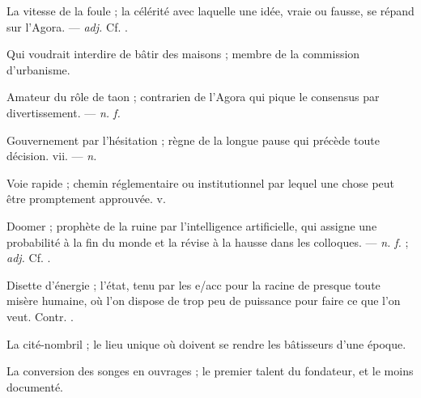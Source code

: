  La vitesse de la foule ; la célérité avec laquelle une idée, vraie ou fausse, se répand sur l'Agora. ---  \textit{adj.} Cf. .

  Qui voudrait interdire de bâtir des maisons ; membre de la commission d'urbanisme.

 Amateur du rôle de taon ; contrarien de l'Agora qui pique le consensus par divertissement. ---  \textit{n. f.}

 Gouvernement par l'hésitation ; règne de la longue pause qui précède toute décision.   vii. ---  \textit{n.}

 Voie rapide ; chemin réglementaire ou institutionnel par lequel une chose peut être promptement approuvée.   v.

 Doomer ; prophète de la ruine par l'intelligence artificielle, qui assigne une probabilité à la fin du monde et la révise à la hausse dans les colloques. ---  \textit{n. f.} ;  \textit{adj.} Cf. .

 Disette d'énergie ; l'état, tenu par les e/acc pour la racine de presque toute misère humaine, où l'on dispose de trop peu de puissance pour faire ce que l'on veut. Contr. .

 La cité-nombril ; le lieu unique où doivent se rendre les bâtisseurs d'une époque.  

 La conversion des songes en ouvrages ; le premier talent du fondateur, et le moins documenté.

